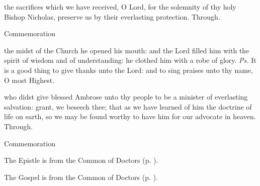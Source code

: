 \postcommunion
{} the sacrifices which we have received, O Lord, for the solemnity of thy holy Bishop Nicholas, preserve us by their everlasting protection. Through.

\begin{rubric}
	Commemoration 
\end{rubric}



\introit
{} the midst of the Church he opened his mouth: and the Lord filled him with the spirit of wisdom and of understanding: he clothed him with a robe of glory. \textit{Ps.} It is a good thing to give thanks unto the Lord: and to sing praises unto thy name, O most Highest.

\collect
{} who didst give blessed Ambrose unto thy people to be a minister of everlasting salvation: grant, we beseech thee; that as we have learned of him the doctrine of life on earth, so we may be found worthy to have him for our advocate in heaven. Through.

\begin{rubric}
	Commemoration 
\end{rubric}

\begin{rubric}
	The Epistle is from the Common of Doctors (p. \pageref{CommonDoctorsEpistle}).
\end{rubric}


\tractnotice
{}

\alleluianotice
{}

\begin{rubric}
	The Gospel is from the Common of Doctors (p. \pageref{CommonDoctorsGospel}).
\end{rubric}

